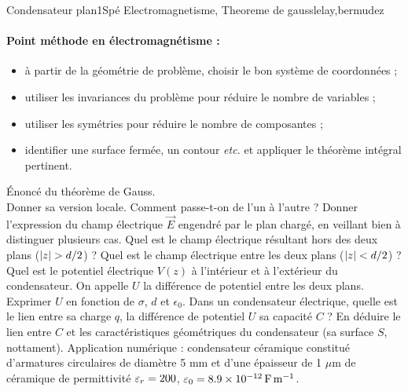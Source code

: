 \begin{exercise}{Condensateur plan}{1}{Spé}
{Electromagnetisme, Theoreme de gauss}{lelay,bermudez}

\paragraph{Point méthode en électromagnétisme :}
\begin{itemize}
    \item à partir de la géométrie de problème, choisir le bon système de coordonnées ;
    \item utiliser les invariances du problème pour réduire le nombre de variables ;
    \item utiliser les symétries pour réduire le nombre de composantes ;
    \item identifier une surface fermée, un contour \emph{etc.} et appliquer le théorème intégral pertinent.
\end{itemize}

\begin{questions}
    \questioncours Énoncé du théorème de Gauss. \\
    Donner sa version locale. Comment passe-t-on de l'un à l'autre ?
    \question Donner l'expression du champ électrique $\vec{E}$ engendré par le plan chargé, en veillant bien à distinguer plusieurs cas.
    \question Quel est le champ électrique résultant hors des deux plans ($\abs{z} > d/2$) ? Quel est le champ électrique entre les deux plans ($\abs{z} < d/2$) ?
    \question Quel est le potentiel électrique $V(z)$ à l'intérieur et à l'extérieur du condensateur.
    \question On appelle $U$ la différence de potentiel entre les deux plans. Exprimer $U$ en fonction de $\sigma$, $d$ et $\epsilon_0$.
    \question Dans un condensateur électrique, quelle est le lien entre sa charge $q$, la différence de potentiel $U$ sa capacité $C$ ? En déduire le lien entre $C$ et les caractéristiques géométriques du condensateur (sa surface $S$, nottament). 
    \question \textsf{Application numérique :} condensateur céramique constitué d'armatures circulaires de diamètre 5 mm et d'une épaisseur de 1 $\mu$m de céramique de permittivité $\varepsilon_r = 200$, $\varepsilon_0 = \SI{8.9e-12}{F.m^{-1}}$.
								  
\end{questions}

\end{exercise}


